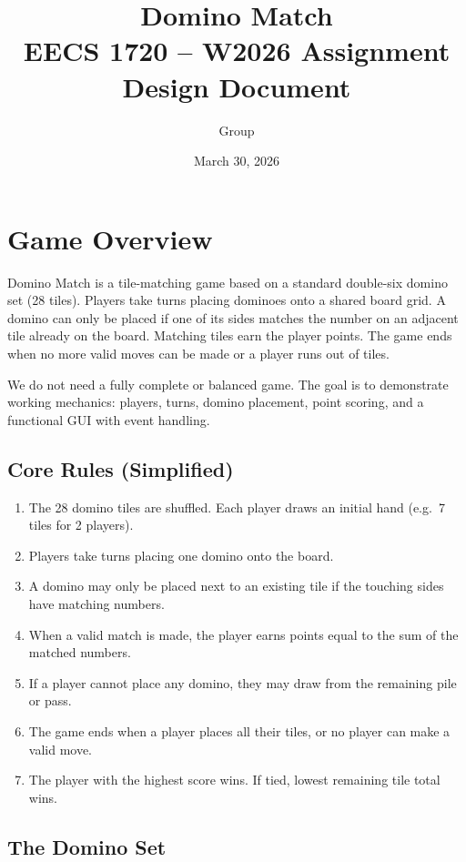 \documentclass[11pt,a4paper]{article}
\title{\textbf{Domino Match} \\ \large EECS 1720 -- W2026 Assignment Design Document}
\author{Group \rule{2cm}{0.4pt}}
\date{March 30, 2026}
\begin{document}
\maketitle
\tableofcontents
\newpage

\section{Game Overview}

Domino Match is a tile-matching game based on a standard double-six domino set (28 tiles). Players take turns placing dominoes onto a shared board grid. A domino can only be placed if one of its sides matches the number on an adjacent tile already on the board. Matching tiles earn the player points. The game ends when no more valid moves can be made or a player runs out of tiles.

We do not need a fully complete or balanced game. The goal is to demonstrate working mechanics: players, turns, domino placement, point scoring, and a functional GUI with event handling.

\subsection{Core Rules (Simplified)}

\begin{enumerate}
  \item The 28 domino tiles are shuffled. Each player draws an initial hand (e.g.\ 7 tiles for 2 players).
  \item Players take turns placing one domino onto the board.
  \item A domino may only be placed next to an existing tile if the touching sides have matching numbers.
  \item When a valid match is made, the player earns points equal to the sum of the matched numbers.
  \item If a player cannot place any domino, they may draw from the remaining pile or pass.
  \item The game ends when a player places all their tiles, or no player can make a valid move.
  \item The player with the highest score wins. If tied, lowest remaining tile total wins.
\end{enumerate}

\subsection{The Domino Set}
\end{document}
